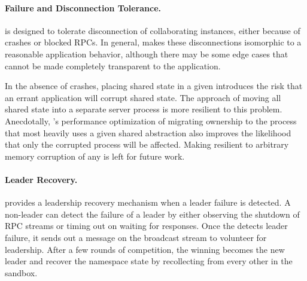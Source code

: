 
 

\paragraph{Failure and Disconnection Tolerance.}  
\sysname{} is designed to tolerate disconnection of collaborating \libos{} instances,
either because of crashes or blocked RPCs.  In general, \sysname{} makes 
these disconnections isomorphic to a reasonable application behavior,
although there may be some edge cases that cannot be made completely transparent to the application.

In the absence of crashes, placing shared state in a given \picoproc{} introduces the risk that an errant 
application will corrupt shared \libos{} state.  The \microkernel{} approach of 
moving all shared state into a separate server process is more resilient to this problem.
Anecdotally, \sysname{}'s performance optimization of migrating ownership to the process that 
most heavily uses a given shared abstraction also improves the likelihood that only the corrupted
process will be affected.  
Making \sysname{} resilient to arbitrary memory corruption of any \picoproc{} is left for future work.


\paragraph{Leader Recovery.}
\sysname{} provides a leadership recovery mechanism when a leader failure is detected.
A non-leader \picoproc{} can detect the failure of a leader by either observing the shutdown of RPC streams or timing out on waiting for responses. 
Once the \picoproc{} detects leader failure, it sends out a message on the broadcast stream to volunteer for leadership.
After a few rounds of competition, the winning \picoproc{} becomes the new leader and recover the namespace state by recollecting from every other \picoproc{} in the sandbox.

